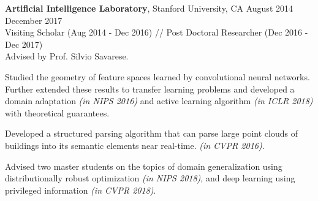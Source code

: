  \textbf{Artificial Intelligence Laboratory}, Stanford University, CA \hfill August 2014 \textendash ~ December 2017 \vspace{0.5mm}\\\vspace{0mm} 
  \hspace{-1.5mm} Visiting Scholar (Aug 2014 - Dec 2016) // Post Doctoral Researcher (Dec 2016 - Dec 2017)  \hfill \vspace{1mm} \\
 Advised by Prof. Silvio Savarese.

Studied the geometry of feature spaces learned by convolutional neural networks. Further extended these results to transfer learning problems and developed a domain adaptation \emph{(in NIPS 2016)} and active learning algorithm \emph{(in ICLR 2018)} with theoretical guarantees. 
 
 \ifx\researchtyperesume\undefined
\else
\newpage
\fi

 \ifx\academictyperesume\undefined
\else
\newpage
\fi


Developed a structured parsing algorithm that can parse large point clouds of buildings into its semantic elements near real-time. \emph{(in CVPR 2016)}.

Advised two master students on the topics of domain generalization using distributionally robust optimization \emph{(in NIPS 2018)}, and deep learning using privileged information \emph{(in CVPR 2018)}. 
